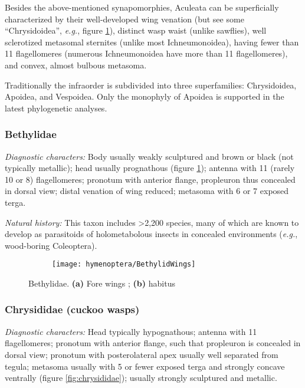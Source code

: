 \noindent{}Besides the above-mentioned synapomorphies, Aculeata can be superficially characterized by their well-developed wing venation (but see some ``Chrysidoidea'', \textit{e.g.}, figure \ref{fig:bethylid1}), distinct wasp waist (unlike sawflies), well sclerotized metasomal sternites (unlike most Ichneumonoidea), having fewer than 11 flagellomeres (numerous Ichneumonoidea have more than 11 flagellomeres), and convex, almost bulbous metasoma.\vspace{3mm}

\noindent{}Traditionally the infraorder is subdivided into three superfamilies: Chrysidoidea, Apoidea, and Vespoidea. Only the monophyly of Apoidea is supported in the latest phylogenetic analyses.

\subsubsection{Bethylidae}
\noindent{}\textit{Diagnostic characters:} Body usually weakly sculptured and brown or black (not typically metallic); head usually prognathous (figure \ref{fig:bethylid1}); antenna with 11 (rarely 10 or 8) flagellomeres; pronotum with anterior flange, propleuron thus concealed in dorsal view; distal venation of wing reduced; metasoma with 6 or 7 exposed terga.\vspace{3mm}

\noindent{}\textit{Natural history:} This taxon includes \textgreater2,200 species, many of which are known to develop as parasitoids of holometabolous insects in concealed environments (\textit{e.g.}, wood-boring Coleoptera).

\begin{figure}[ht!]
  \centering
\begin{subfigure}[ht!]{0.28\textwidth}
    \texttt{[image: hymenoptera/BethylidWings]}
  \caption{}
  \label{fig:bethylid1}
\end{subfigure}
    \qquad
\begin{subfigure}[ht!]{0.35\textwidth}
  \caption{}
  \label{fig:bethylid2}
\end{subfigure}
    \caption{Bethylidae. \textbf{(a)} Fore wings \citep[][pg. 134]{goulet1993hymenoptera}; \textbf{(b)} habitus \citep[][Fig. 37]{goulet1993hymenoptera}}\label{fig:bethylids}
\end{figure}

\subsubsection{Chrysididae (cuckoo wasps)}
\noindent{}\textit{Diagnostic characters:} Head typically hypognathous; antenna with 11 flagellomeres; pronotum with anterior flange, such that propleuron is concealed in dorsal view; pronotum with posterolateral apex usually well separated from tegula; metasoma usually with 5 or fewer exposed terga and strongly concave ventrally (figure \ref{fig:chrysididae}); usually strongly sculptured and metallic.\vspace{3mm}

